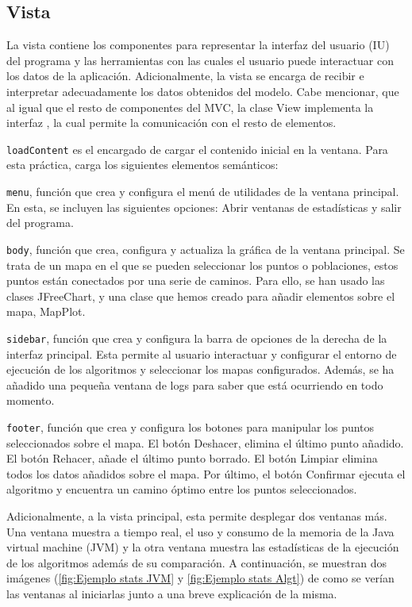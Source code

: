 \subsection{Vista}

La vista contiene los componentes para representar la interfaz del usuario (IU) del programa y las herramientas con las cuales el usuario puede interactuar con los datos de la aplicación. Adicionalmente, la vista se encarga de recibir e interpretar adecuadamente los datos obtenidos del modelo. Cabe mencionar, que al igual que el resto de componentes del MVC, la clase View implementa la interfaz , la cual permite la comunicación con el resto de elementos.\bigskip

\texttt{loadContent} es el encargado de cargar el contenido inicial en la ventana. Para esta práctica, carga los siguientes elementos semánticos:\bigskip

\texttt{menu}, función que crea y configura el menú de utilidades de la ventana principal. En esta, se incluyen las siguientes opciones: Abrir ventanas de estadísticas y salir del programa.\bigskip

\texttt{body}, función que crea, configura y actualiza la gráfica de la ventana principal. Se trata de un mapa en el que se pueden seleccionar los puntos o poblaciones, estos puntos están conectados por una serie de caminos. Para ello, se han usado las clases JFreeChart, y una clase que hemos creado para añadir elementos sobre el mapa, MapPlot. \bigskip

\texttt{sidebar}, función que crea y configura la barra de opciones de la derecha de la interfaz principal. Esta permite al usuario interactuar y configurar el entorno de ejecución de los algoritmos y seleccionar los mapas configurados. Además, se ha añadido una pequeña ventana de logs para saber que está ocurriendo en todo momento.\bigskip

\texttt{footer}, función que crea y configura los botones para manipular los puntos seleccionados sobre el mapa. El botón Deshacer, elimina el último punto añadido. El botón Rehacer, añade el último punto borrado. El botón Limpiar elimina todos los datos añadidos sobre el mapa. Por último, el botón Confirmar ejecuta el algoritmo y encuentra un camino óptimo entre los puntos seleccionados. \bigskip

Adicionalmente, a la vista principal, esta permite desplegar dos ventanas más. Una ventana muestra a tiempo real, el uso y consumo de la memoria de la Java virtual machine (JVM) y la otra ventana muestra las estadísticas de la ejecución de los algoritmos además de su comparación. A continuación, se muestran dos imágenes (\ref{fig:Ejemplo stats JVM} y \ref{fig:Ejemplo stats Algt}) de como se verían las ventanas al iniciarlas junto a una breve explicación de la misma.

